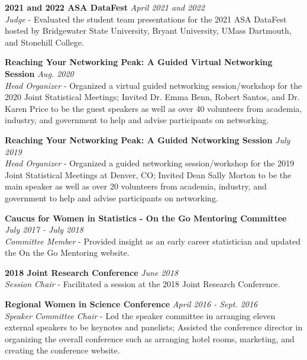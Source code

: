 \documentclass[11pt, letterpaper, roman]{moderncv} %
\newcommand{\outreachspace}{\vspace{5pt}}
\begin{document}
\outreachspace
\textbf{2021 and 2022 ASA DataFest} \hfill \textit{April 2021 and 2022}\\
\textit{Judge} - Evaluated the student team presentations for the 2021 ASA DataFest hosted by Bridgewater State University, Bryant University, UMass Dartmouth, and Stonehill College.

\outreachspace
\textbf{Reaching Your Networking Peak: A Guided Virtual Networking Session} \hfill \textit{Aug. 2020}\\
\textit{Head Organizer} - Organized a virtual guided networking session/workshop for the 2020 Joint Statistical Meetings; Invited Dr. Emma Benn, Robert Santos, and Dr. Karen Price to be the guest speakers as well as over 40 volunteers from academia, industry, and government to help and advise participants on networking.

\outreachspace
{}

\outreachspace
\textbf{Reaching Your Networking Peak: A Guided Networking Session} \hfill \textit{July 2019}\\
\textit{Head Organizer} - Organized a guided networking session/workshop for the 2019 Joint Statistical Meetings at Denver, CO; Invited Dean Sally Morton to be the main speaker as well as over 20 volunteers from academia, industry, and government to help and advise participants on networking.

\outreachspace
\textbf{Caucus for Women in Statistics - On the Go Mentoring Committee} \hfill \textit{July 2017 - July 2018}\\
\textit{Committee Member} - Provided insight as an early career statistician and updated the On the Go Mentoring website.

\outreachspace
\textbf{2018 Joint Research Conference} \hfill \textit{June 2018}\\
\textit{Session Chair} - Facilitated a session at the 2018 Joint Research Conference.

\outreachspace
\textbf{Regional Women in Science Conference} \hfill \textit{April 2016 - Sept. 2016}\\
\textit{Speaker Committee Chair} - Led the speaker committee in arranging eleven external speakers to be keynotes and panelists; Assisted the conference director in organizing the overall conference such as arranging hotel rooms, marketing, and creating the conference website.
\end{document}
